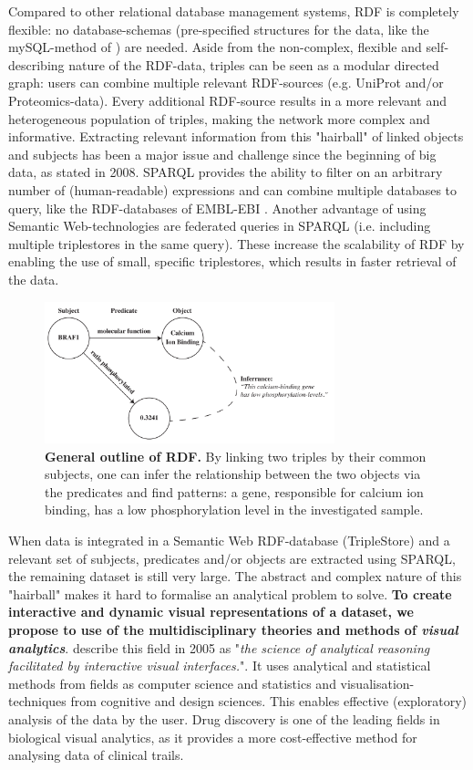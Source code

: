 \documentclass[twoside,fontsize=10pt]{article}
\begin{document}
Compared to other relational database management systems, RDF is completely flexible: no database-schemas (pre-specified structures for the data, like the mySQL-method of \citet{Low2013}) are needed. Aside from the non-complex, flexible and self-describing nature of the RDF-data, triples can be seen as a modular directed graph: users can combine multiple relevant RDF-sources (e.g. UniProt and/or Proteomics-data). Every additional RDF-source results in a more relevant and heterogeneous population of triples, making the network more complex and informative. Extracting relevant information from this "hairball" of linked objects and subjects has been a major issue and challenge since the beginning of big data, as \citet{Pavlopoulos2008} stated in 2008. SPARQL provides the ability to filter on an arbitrary number of (human-readable) expressions and can combine multiple databases to query, like the RDF-databases of EMBL-EBI \citep{Jupp2014}. Another advantage of using Semantic Web-technologies are federated queries in SPARQL (i.e. including multiple triplestores in the same query). These increase the scalability of RDF by enabling the use of small, specific triplestores, which results in faster retrieval of the data.
\medskip
\begin{figure}[H]
    \centering
    \includegraphics[width=0.75\textwidth]{rdf}
    \caption{\textbf{General outline of RDF.} By linking two triples by their common subjects, one can infer the relationship between the two objects via the predicates and find patterns: a gene, responsible for calcium ion binding, has a low phosphorylation level in the investigated sample.}
    \label{fig:rdf}
\end{figure}
\noindent
When data is integrated in a Semantic Web RDF-database (TripleStore) and a relevant set of subjects, predicates and/or objects are extracted using SPARQL, the remaining dataset is still very large. The abstract and complex nature of this "hairball" makes it hard to formalise an analytical problem to solve. \textbf{To create interactive and dynamic visual representations of a dataset, we propose to use of the multidisciplinary theories and methods of \textit{visual analytics}}. \citet{Thomas2005} describe this field in 2005 as "\textit{the science of analytical reasoning facilitated by interactive visual interfaces.}". It uses analytical and statistical methods from fields as computer science and statistics and visualisation-techniques from cognitive and design sciences. This enables effective (exploratory) analysis of the data by the user. Drug discovery is one of the leading fields in biological visual analytics, as it provides a more cost-effective method for analysing data of clinical trails\cite{Cao2008}.
\end{document}
